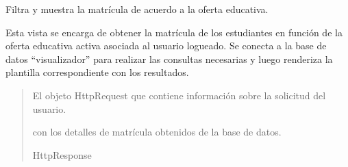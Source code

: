\documentclass[letterpaper,10pt,spanish]{sphinxmanual}
\begin{document}
\begin{fulllineitems}

\pysigstartsignatures
{}
\pysigstopsignatures
\sphinxAtStartPar
Filtra y muestra la matrícula de acuerdo a la oferta educativa.

\sphinxAtStartPar
Esta vista se encarga de obtener la matrícula de los estudiantes
en función de la oferta educativa activa asociada al usuario logueado.
Se conecta a la base de datos “visualizador” para realizar las consultas
necesarias y luego renderiza la plantilla correspondiente con los resultados.
\begin{quote}\begin{description}
\sphinxAtStartPar
{} \textendash{} El objeto HttpRequest que contiene información sobre la
solicitud del usuario.

\sphinxAtStartPar
\begin{description}
\sphinxAtStartPar
con los detalles de matrícula obtenidos de la base de datos.

\end{description}


\sphinxAtStartPar
HttpResponse

\end{description}\end{quote}

\end{fulllineitems}
\end{document}
